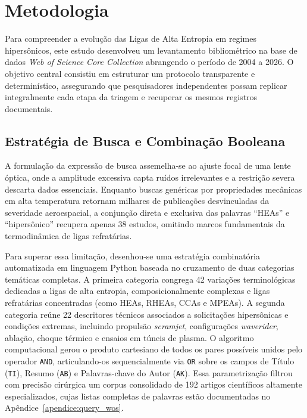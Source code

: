 \section{Metodologia}\label{sec:metodologia}

Para compreender a evolução das Ligas de Alta Entropia em regimes hipersônicos, este estudo desenvolveu um levantamento bibliométrico na base de dados \emph{Web of Science Core Collection} abrangendo o período de 2004 a 2026. O objetivo central consistiu em estruturar um protocolo transparente e determinístico, assegurando que pesquisadores independentes possam replicar integralmente cada etapa da triagem e recuperar os mesmos registros documentais.

\subsection{Estratégia de Busca e Combinação Booleana}\label{sec:estrategia_busca}

A formulação da expressão de busca assemelha-se ao ajuste focal de uma lente óptica, onde a amplitude excessiva capta ruídos irrelevantes e a restrição severa descarta dados essenciais. Enquanto buscas genéricas por propriedades mecânicas em alta temperatura retornam milhares de publicações desvinculadas da severidade aeroespacial, a conjunção direta e exclusiva das palavras ``HEAs'' e ``hipersônico'' recupera apenas 38 estudos, omitindo marcos fundamentais da termodinâmica de ligas refratárias.

Para superar essa limitação, desenhou-se uma estratégia combinatória automatizada em linguagem Python baseada no cruzamento de duas categorias temáticas completas. A primeira categoria congrega 42 variações terminológicas dedicadas a ligas de alta entropia, composicionalmente complexas e ligas refratárias concentradas (como HEAs, RHEAs, CCAs e MPEAs). A segunda categoria reúne 22 descritores técnicos associados a solicitações hipersônicas e condições extremas, incluindo propulsão \emph{scramjet}, configurações \emph{waverider}, ablação, choque térmico e ensaios em túneis de plasma. O algoritmo computacional gerou o produto cartesiano de todos os pares possíveis unidos pelo operador \texttt{AND}, articulando-os sequencialmente via \texttt{OR} sobre os campos de Título (\texttt{TI}), Resumo (\texttt{AB}) e Palavras-chave do Autor (\texttt{AK}). Essa parametrização filtrou com precisão cirúrgica um corpus consolidado de 192 artigos científicos altamente especializados, cujas listas completas de palavras estão documentadas no Apêndice~\ref{apendice:query_wos}.

